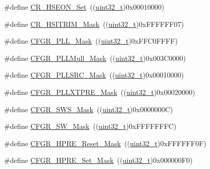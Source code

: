 \begin{DoxyCompactItemize}
\item 
\#define \hyperlink{group___r_c_c___private___defines_gaca6ef9e2f11b921355809a5eccfec864}{C\+R\+\_\+\+H\+S\+E\+O\+N\+\_\+\+Set}~((\hyperlink{_p_e___types_8h_a33594304e786b158f3fb30289278f5af}{uint32\+\_\+t})0x00010000)
\item 
\#define \hyperlink{group___r_c_c___private___defines_gac6a6adccdfb5a34541e2cdf01daf98ce}{C\+R\+\_\+\+H\+S\+I\+T\+R\+I\+M\+\_\+\+Mask}~((\hyperlink{_p_e___types_8h_a33594304e786b158f3fb30289278f5af}{uint32\+\_\+t})0x\+F\+F\+F\+F\+F\+F07)
\item 
\#define \hyperlink{group___r_c_c___private___defines_gaea605b2eaea5332218130fc2d20d917c}{C\+F\+G\+R\+\_\+\+P\+L\+L\+\_\+\+Mask}~((\hyperlink{_p_e___types_8h_a33594304e786b158f3fb30289278f5af}{uint32\+\_\+t})0x\+F\+F\+C0\+F\+F\+F\+F)
\item 
\#define \hyperlink{group___r_c_c___private___defines_ga26ac4de307d4c081867dc0344f54c17a}{C\+F\+G\+R\+\_\+\+P\+L\+L\+Mull\+\_\+\+Mask}~((\hyperlink{_p_e___types_8h_a33594304e786b158f3fb30289278f5af}{uint32\+\_\+t})0x003\+C0000)
\item 
\#define \hyperlink{group___r_c_c___private___defines_ga8fd33db1092dfc565314b7bf395bba23}{C\+F\+G\+R\+\_\+\+P\+L\+L\+S\+R\+C\+\_\+\+Mask}~((\hyperlink{_p_e___types_8h_a33594304e786b158f3fb30289278f5af}{uint32\+\_\+t})0x00010000)
\item 
\#define \hyperlink{group___r_c_c___private___defines_ga025835ddeb698b8c119ddf355b2fbded}{C\+F\+G\+R\+\_\+\+P\+L\+L\+X\+T\+P\+R\+E\+\_\+\+Mask}~((\hyperlink{_p_e___types_8h_a33594304e786b158f3fb30289278f5af}{uint32\+\_\+t})0x00020000)
\item 
\#define \hyperlink{group___r_c_c___private___defines_gaefba904c88a72c7e2c12e8fcef38300a}{C\+F\+G\+R\+\_\+\+S\+W\+S\+\_\+\+Mask}~((\hyperlink{_p_e___types_8h_a33594304e786b158f3fb30289278f5af}{uint32\+\_\+t})0x0000000\+C)
\item 
\#define \hyperlink{group___r_c_c___private___defines_ga41e0b286664f76c2057cffb134809c51}{C\+F\+G\+R\+\_\+\+S\+W\+\_\+\+Mask}~((\hyperlink{_p_e___types_8h_a33594304e786b158f3fb30289278f5af}{uint32\+\_\+t})0x\+F\+F\+F\+F\+F\+F\+F\+C)
\item 
\#define \hyperlink{group___r_c_c___private___defines_ga55937d93be56562243d92c507145112c}{C\+F\+G\+R\+\_\+\+H\+P\+R\+E\+\_\+\+Reset\+\_\+\+Mask}~((\hyperlink{_p_e___types_8h_a33594304e786b158f3fb30289278f5af}{uint32\+\_\+t})0x\+F\+F\+F\+F\+F\+F0\+F)
\item 
\#define \hyperlink{group___r_c_c___private___defines_gaca06c6cc484e08423a56cfca6928b9ae}{C\+F\+G\+R\+\_\+\+H\+P\+R\+E\+\_\+\+Set\+\_\+\+Mask}~((\hyperlink{_p_e___types_8h_a33594304e786b158f3fb30289278f5af}{uint32\+\_\+t})0x000000\+F0)

\end{DoxyCompactItemize}
